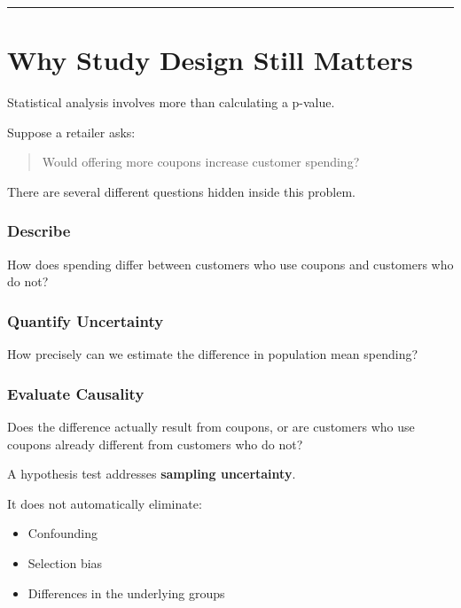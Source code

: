 \documentclass[
  letterpaper,
  DIV=11,
  numbers=noendperiod]{scrreprt}
\providecommand{\tightlist}{%
  \setlength{\itemsep}{0pt}\setlength{\parskip}{0pt}}
\begin{document}
\begin{center}\rule{0.5\linewidth}{0.5pt}\end{center}


\chapter{Why Study Design Still
Matters}\label{why-study-design-still-matters}

Statistical analysis involves more than calculating a p-value.

Suppose a retailer asks:

\begin{quote}
Would offering more coupons increase customer spending?
\end{quote}

There are several different questions hidden inside this problem.

\subsection{Describe}\label{describe}

How does spending differ between customers who use coupons and customers
who do not?

\subsection{Quantify Uncertainty}\label{quantify-uncertainty}

How precisely can we estimate the difference in population mean
spending?

\subsection{Evaluate Causality}\label{evaluate-causality}

Does the difference actually result from coupons, or are customers who
use coupons already different from customers who do not?

A hypothesis test addresses \textbf{sampling uncertainty}.

It does not automatically eliminate:

\begin{itemize}
\tightlist
\item
  Confounding
\item
  Selection bias
\item
  Differences in the underlying groups
\end{itemize}
\end{document}
